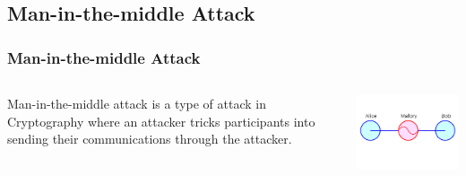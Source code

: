 \documentclass{beamer}
\begin{document}
\subsection{Man-in-the-middle Attack}
\begin{frame}
	
		\frametitle{Man-in-the-middle Attack}
		\begin{columns}
		\begin{column}[T]{5cm}
		Man-in-the-middle attack is a type of attack in Cryptography where an attacker tricks participants into sending their communications through the attacker.   
		\end{column}
		\includegraphics[scale=.45]{Images/MIM.jpg}
		\end{columns}
		\end{frame}
		
\end{document}
